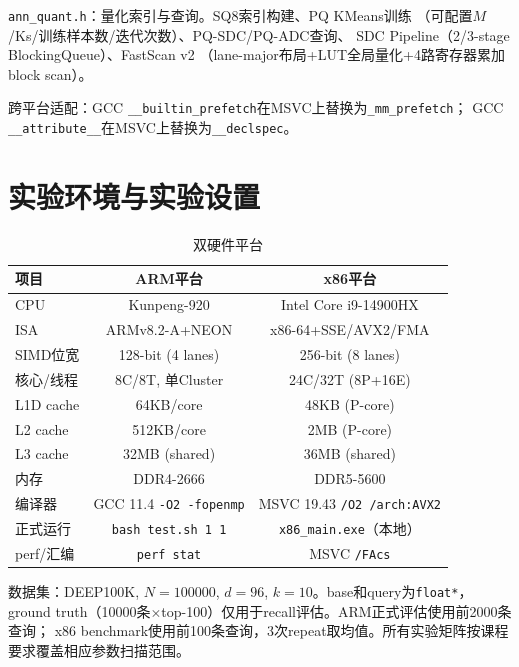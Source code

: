 \documentclass[11pt,a4paper]{article}
\begin{document}
\texttt{ann\_quant.h}：量化索引与查询。SQ8索引构建、PQ KMeans训练
（可配置$M$/Ks/训练样本数/迭代次数）、PQ-SDC/PQ-ADC查询、
SDC Pipeline（2/3-stage BlockingQueue）、FastScan v2
（lane-major布局+LUT全局量化+4路寄存器累加block scan）。

跨平台适配：GCC \texttt{\_\_builtin\_prefetch}在MSVC上替换为\texttt{\_mm\_prefetch}；
GCC \texttt{\_\_attribute\_\_}在MSVC上替换为\texttt{\_\_declspec}。

\section{实验环境与实验设置}

\begin{table}[H]
\centering
\caption{双硬件平台}
\label{tab:plat}
\small
\begin{tabular}{lcc}
\toprule
\textbf{项目} & \textbf{ARM平台} & \textbf{x86平台} \\
\midrule
CPU & Kunpeng-920 & Intel Core i9-14900HX \\
ISA & ARMv8.2-A+NEON & x86-64+SSE/AVX2/FMA \\
SIMD位宽 & 128-bit (4 lanes) & 256-bit (8 lanes) \\
核心/线程 & 8C/8T, 单Cluster & 24C/32T (8P+16E) \\
L1D cache & 64KB/core & 48KB (P-core) \\
L2 cache & 512KB/core & 2MB (P-core) \\
L3 cache & 32MB (shared) & 36MB (shared) \\
内存 & DDR4-2666 & DDR5-5600 \\
编译器 & GCC 11.4 \texttt{-O2 -fopenmp} & MSVC 19.43 \texttt{/O2 /arch:AVX2} \\
正式运行 & \texttt{bash test.sh 1 1} & \texttt{x86\_main.exe}（本地） \\
perf/汇编 & \texttt{perf stat} & MSVC \texttt{/FAcs} \\
\bottomrule
\end{tabular}
\end{table}

数据集：DEEP100K, $N=100000$, $d=96$, $k=10$。base和query为\texttt{float*}，
ground truth（10000条$\times$top-100）仅用于recall评估。ARM正式评估使用前2000条查询；
x86 benchmark使用前100条查询，3次repeat取均值。所有实验矩阵按课程要求覆盖相应参数扫描范围。

\end{document}
